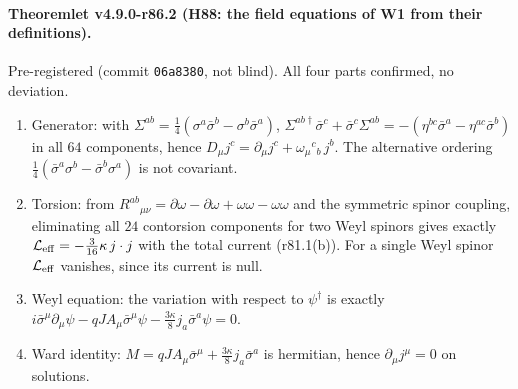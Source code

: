 \paragraph{Theoremlet v4.9.0-r86.2 (H88: the field equations of W1 from their definitions).}
Pre-registered (commit \texttt{06a8380}, not blind).  All four parts confirmed, no deviation.
\begin{enumerate}[leftmargin=2em]
\item[(a)] Generator: with \(\Sigma^{ab}=\tfrac14(\sigma^a\bar\sigma^b-\sigma^b\bar\sigma^a)\), \(\Sigma^{ab\dagger}\bar\sigma^c+\bar\sigma^c\Sigma^{ab}=-(\eta^{bc}\bar\sigma^a-\eta^{ac}\bar\sigma^b)\)
in all \(64\) components, hence \(D_\mu j^c=\partial_\mu j^c+\omega_\mu{}^c{}_b\,j^b\).  The alternative ordering \(\tfrac14(\bar\sigma^a\sigma^b-\bar\sigma^b\sigma^a)\) is not
covariant.
\item[(b)] Torsion: from \(R^{ab}{}_{\mu\nu}=\partial\omega-\partial\omega+\omega\omega-\omega\omega\) and the symmetric spinor coupling, eliminating all \(24\)
contorsion components for two Weyl spinors gives exactly \(\mathcal L_{\rm eff}=-\tfrac3{16}\kappa\,j\cdot j\) with the total current (r81.1(b)).  For a
single Weyl spinor \(\mathcal L_{\rm eff}\) vanishes, since its current is null.
\item[(c)] Weyl equation: the variation with respect to \(\psi^\dagger\) is exactly
\(i\bar\sigma^\mu\partial_\mu\psi-qJA_\mu\bar\sigma^\mu\psi-\tfrac{3\kappa}{8}j_a\bar\sigma^a\psi=0\).
\item[(d)] Ward identity: \(M=qJA_\mu\bar\sigma^\mu+\tfrac{3\kappa}{8}j_a\bar\sigma^a\) is hermitian, hence \(\partial_\mu j^\mu=0\) on solutions.
\end{enumerate}

